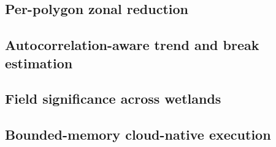 \documentclass[review]{elsarticle}
\begin{document}
\subsection{Per-polygon zonal reduction}\label{sec:zonal}

\subsection{Autocorrelation-aware trend and break estimation}\label{sec:trend}

\subsection{Field significance across wetlands}\label{sec:fdr}

\subsection{Bounded-memory cloud-native execution}\label{sec:engine}
\end{document}

